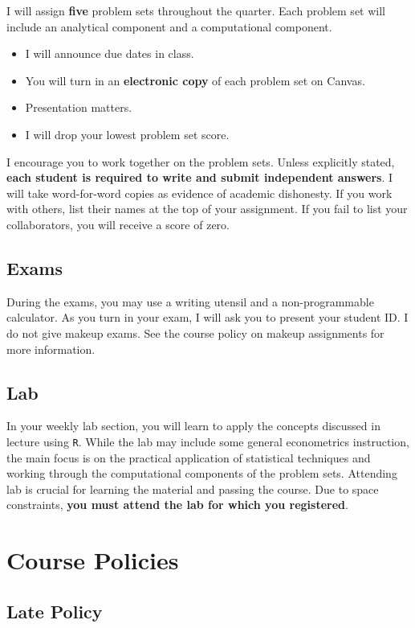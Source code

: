 \documentclass[11pt]{article}
\begin{document}
I will assign \textbf{five} problem sets throughout the quarter. Each problem set will include an analytical component and a computational component. 
\begin{itemize}
	\setlength{\itemsep}{0pt}
	\item I will announce due dates in class. 
	\item You will turn in an \textbf{electronic copy} of each problem set on Canvas.
	\item Presentation matters. 
	\item I will drop your lowest problem set score.
\end{itemize}
I encourage you to work together on the problem sets. Unless explicitly stated, \textbf{each student is required to write and submit independent answers}. I will take word-for-word copies as evidence of academic dishonesty. If you work with others, list their names at the top of your assignment. If you fail to list your collaborators, you will receive a score of zero.

\subsection*{Exams} 

During the exams, you may use a writing utensil and a non-programmable calculator. As you turn in your exam, I will ask you to present your student ID. I do not give makeup exams. See the course policy on makeup assignments for more information.  

\subsection*{Lab} 

In your weekly lab section, you will learn to apply the concepts discussed in lecture using \texttt{R}. While the lab may include some general econometrics instruction, the main focus is on the practical application of statistical techniques and working through the computational components of the problem sets. Attending lab is crucial for learning the material and passing the course. Due to space constraints, \textbf{you must attend the lab for which you registered}.

\section*{Course Policies}

\subsection*{Late Policy} 
\end{document}
